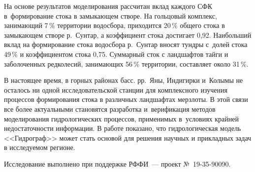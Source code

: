 

На основе результатов моделирования рассчитан вклад каждого СФК в~формирование стока в замыкающем створе. На гольцовый комплекс, занимающий 7\,\% территории водосбора, приходится 20\,\% общего стока в замыкающем створе р.~Сунтар, а коэффициент стока достигает 0,92. Наибольший вклад на формирование стока водосбора р.~Сунтар вносят тундры с~долей стока 49\,\% и коэффициентом стока 0,75. Суммарный сток с ландшафтов тайги и заболоченных редколесий, занимающих 56\,\% территории, составляет около 31\,\%.

В настоящее время, в горных районах басс. рр.~Яны, Индигирки и~Колымы не осталось ни одной исследовательской станции для комплексного изучения процессов формирования стока в различных ландшафтах мерзлоты. В этой связи все более актуальными становятся разработка и~верификация методов моделирования гидрологических процессов, применимых в~условиях крайней недостаточности информации. В работе показано, что гидрологическая модель <<Гидрограф>> может стать основой для решения научных и прикладных задач в исследуемом регионе.

Исследование выполнено при поддержке РФФИ~--- проект №~19-35-90090.

